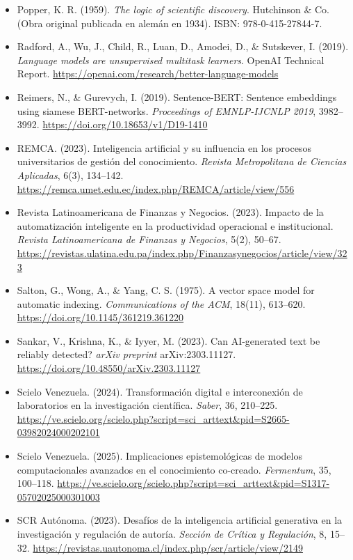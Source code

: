 \begin{itemize}[leftmargin=1.5em, label={}, itemsep=0.22ex, parsep=0pt]
    \item Popper, K. R. (1959). \textit{The logic of scientific discovery}. Hutchinson \& Co. (Obra original publicada en alemán en 1934). ISBN: 978-0-415-27844-7.
    \item Radford, A., Wu, J., Child, R., Luan, D., Amodei, D., \& Sutskever, I. (2019). \textit{Language models are unsupervised multitask learners}. OpenAI Technical Report. \url{https://openai.com/research/better-language-models}
    \item Reimers, N., \& Gurevych, I. (2019). Sentence-BERT: Sentence embeddings using siamese BERT-networks. \textit{Proceedings of EMNLP-IJCNLP 2019}, 3982--3992. \url{https://doi.org/10.18653/v1/D19-1410}
    \item REMCA. (2023). Inteligencia artificial y su influencia en los procesos universitarios de gestión del conocimiento. \textit{Revista Metropolitana de Ciencias Aplicadas}, 6(3), 134--142. \url{https://remca.umet.edu.ec/index.php/REMCA/article/view/556}
    \item Revista Latinoamericana de Finanzas y Negocios. (2023). Impacto de la automatización inteligente en la productividad operacional e institucional. \textit{Revista Latinoamericana de Finanzas y Negocios}, 5(2), 50--67. \url{https://revistas.ulatina.edu.pa/index.php/Finanzasynegocios/article/view/323}
    \item Salton, G., Wong, A., \& Yang, C. S. (1975). A vector space model for automatic indexing. \textit{Communications of the ACM}, 18(11), 613--620. \url{https://doi.org/10.1145/361219.361220}
    \item Sankar, V., Krishna, K., \& Iyyer, M. (2023). Can AI-generated text be reliably detected? \textit{arXiv preprint} arXiv:2303.11127. \url{https://doi.org/10.48550/arXiv.2303.11127}
    \item Scielo Venezuela. (2024). Transformación digital e interconexión de laboratorios en la investigación científica. \textit{Saber}, 36, 210--225. \url{https://ve.scielo.org/scielo.php?script=sci_arttext&pid=S2665-03982024000202101}
    \item Scielo Venezuela. (2025). Implicaciones epistemológicas de modelos computacionales avanzados en el conocimiento co-creado. \textit{Fermentum}, 35, 100--118. \url{https://ve.scielo.org/scielo.php?script=sci_arttext&pid=S1317-05702025000301003}
    \item SCR Autónoma. (2023). Desafíos de la inteligencia artificial generativa en la investigación y regulación de autoría. \textit{Sección de Crítica y Regulación}, 8, 15--32. \url{https://revistas.uautonoma.cl/index.php/scr/article/view/2149}

\end{itemize}
